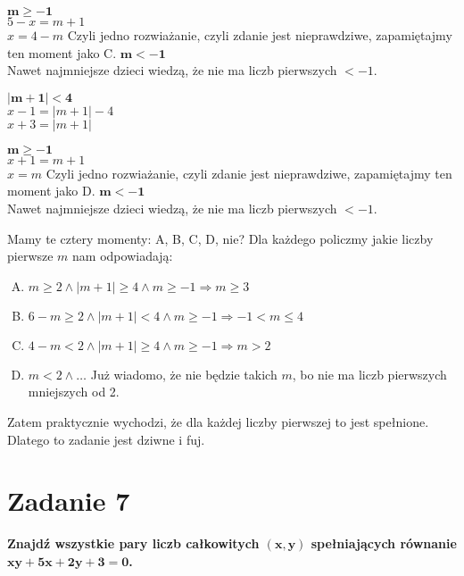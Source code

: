 \documentclass [a4paper, 10pt]{article}
\begin{document}
\begin{center}
\begin{multicols}{2}
\begin{multicols}{2}
            \begin{multicols}{2}
                $\mathbf{m \ge -1}$\\
                $5-x = m+1$\\
                $x = 4-m$
                Czyli jedno rozwiażanie, czyli zdanie jest nieprawdziwe, zapamiętajmy ten moment jako C.
                \vfill\columnbreak
                $\mathbf{m < -1}$\\
                    Nawet najmniejsze dzieci wiedzą, że nie ma liczb pierwszych $< -1$.
            \end{multicols}
        \vfill\columnbreak
        $\mathbf{|m+1| < 4}$\\
            $x-1 = |m+1| - 4$\\
            $x+3 = |m+1|$\\
            \begin{multicols}{2}
                $\mathbf{m \ge -1}$\\
                $x+1 = m+1$\\
                $x = m$
                Czyli jedno rozwiażanie, czyli zdanie jest nieprawdziwe, zapamiętajmy ten moment jako D.
                \vfill\columnbreak
                $\mathbf{m < -1}$\\
                    Nawet najmniejsze dzieci wiedzą, że nie ma liczb pierwszych $< -1$.
            \end{multicols}
    \end{multicols}
\end{multicols}\end{center}
Mamy te cztery momenty: A, B, C, D, nie? Dla każdego policzmy jakie liczby pierwsze $m$ nam odpowiadają:
\begin{enumerate}[A)]
    \item $m\ge 2 \land |m+1| \ge 4 \land m\ge-1 \Rightarrow m \ge 3$
    \item $6-m \ge 2 \land |m+1| < 4 \land m\ge-1 \Rightarrow -1 < m \le 4$
    \item $4-m < 2 \land |m+1| \ge 4 \land m\ge -1\Rightarrow m > 2$
    \item $m < 2 \land \dots$ Już wiadomo, że nie będzie takich $m$, bo nie ma liczb pierwszych mniejszych od 2.
\end{enumerate}
Zatem praktycznie wychodzi, że dla każdej liczby pierwszej to jest spełnione. Dlatego to zadanie jest dziwne i fuj.

\section*{Zadanie 7}
\bf Znajdź wszystkie pary liczb całkowitych $\mathbf{(x,y)}$ spełniających równanie $\mathbf{xy + 5x + 2y + 3 = 0}$.
\end{document}
